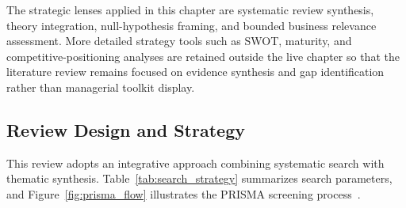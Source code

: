 The strategic lenses applied in this chapter are systematic review synthesis, theory integration, null-hypothesis framing, and bounded business relevance assessment. More detailed strategy tools such as SWOT, maturity, and competitive-positioning analyses are retained outside the live chapter so that the literature review remains focused on evidence synthesis and gap identification rather than managerial toolkit display.

\subsection{Review Design and Strategy}

This review adopts an integrative approach combining systematic search with thematic synthesis. Table~\ref{tab:search_strategy} summarizes search parameters, and Figure~\ref{fig:prisma_flow} illustrates the PRISMA screening process~\cite{moher2009prisma}.



